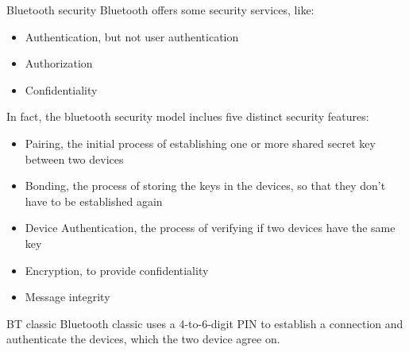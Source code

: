 \begin{section}{Bluetooth security}
  Bluetooth offers some security services, like:
  \begin{itemize}
    \item Authentication, but not user authentication
    \item Authorization
    \item Confidentiality
  \end{itemize}
  In fact, the bluetooth security model inclues five distinct security features:
  \begin{itemize}
    \item Pairing, the initial process of establishing one or more shared secret key between two
      devices
    \item Bonding, the process of storing the keys in the devices, so that they don't have to be
      established again
    \item Device Authentication, the process of verifying if two devices have the same key
    \item Encryption, to provide confidentiality
    \item Message integrity
  \end{itemize}
  \begin{subsection}{BT classic}
    Bluetooth classic uses a 4-to-6-digit PIN to establish a connection and authenticate the
    devices, which the two device agree on.\\


\end{subsection}
\end{section}
